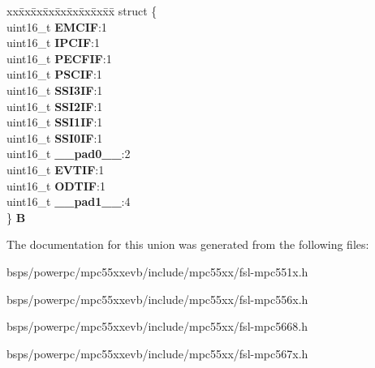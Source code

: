 \begin{DoxyCompactItemize}
\begin{tabbing}
\end{tabbing}\item 
\mbox{\label{unionuPIFR1_ab6237ef5d5e41ee541c05ae7c451a8a7}} 
\begin{tabbing}
xx\=xx\=xx\=xx\=xx\=xx\=xx\=xx\=xx\=\kill
struct \{\\
\>uint16\_t {\bfseries EMCIF}:1\\
\>uint16\_t {\bfseries IPCIF}:1\\
\>uint16\_t {\bfseries PECFIF}:1\\
\>uint16\_t {\bfseries PSCIF}:1\\
\>uint16\_t {\bfseries SSI3IF}:1\\
\>uint16\_t {\bfseries SSI2IF}:1\\
\>uint16\_t {\bfseries SSI1IF}:1\\
\>uint16\_t {\bfseries SSI0IF}:1\\
\>uint16\_t {\bfseries \_\_pad0\_\_}:2\\
\>uint16\_t {\bfseries EVTIF}:1\\
\>uint16\_t {\bfseries ODTIF}:1\\
\>uint16\_t {\bfseries \_\_pad1\_\_}:4\\
\} {\bfseries B}\\

\end{tabbing}\end{DoxyCompactItemize}


The documentation for this union was generated from the following files\+:\begin{DoxyCompactItemize}
\item 
bsps/powerpc/mpc55xxevb/include/mpc55xx/fsl-\/mpc551x.\+h\item 
bsps/powerpc/mpc55xxevb/include/mpc55xx/fsl-\/mpc556x.\+h\item 
bsps/powerpc/mpc55xxevb/include/mpc55xx/fsl-\/mpc5668.\+h\item 
bsps/powerpc/mpc55xxevb/include/mpc55xx/fsl-\/mpc567x.\+h\end{DoxyCompactItemize}
